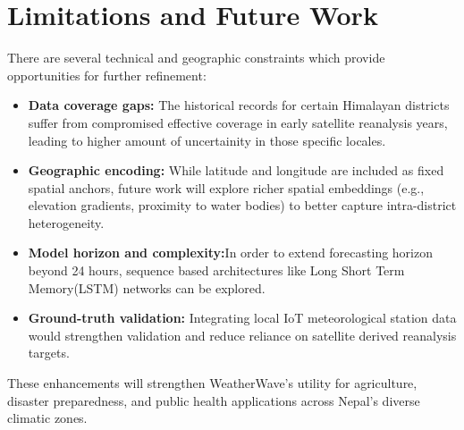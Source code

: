 \documentclass[conference]{IEEEtran}
\begin{document}
\section{Limitations and Future Work}
There are several technical and geographic constraints which provide opportunities for further refinement:
\begin{itemize}
  \item \textbf{Data coverage gaps:} The historical records for certain Himalayan districts suffer from compromised effective coverage in early satellite reanalysis years, leading to higher amount of uncertainity in those specific locales.
  \item \textbf{Geographic encoding:} While latitude and longitude are included as fixed spatial anchors, future work will explore richer spatial embeddings (e.g., elevation gradients, proximity to water bodies) to better capture intra-district heterogeneity.
  \item \textbf{Model horizon and complexity:}In order to extend forecasting horizon beyond 24 hours, sequence based architectures like Long Short Term Memory(LSTM) networks can be explored.
  \item \textbf{Ground-truth validation:} Integrating local IoT meteorological station data would strengthen validation and reduce reliance on satellite derived reanalysis targets.
\end{itemize}
These enhancements will strengthen WeatherWave's utility for agriculture, disaster preparedness, and public health applications across Nepal's diverse climatic zones.

\end{document}
